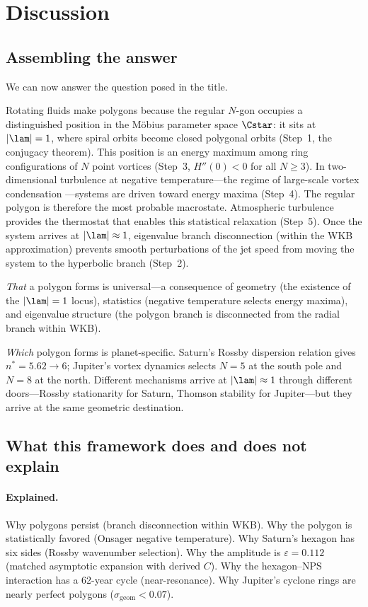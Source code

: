 \section{Discussion}
\label{sec:discussion}

\subsection{Assembling the answer}

We can now answer the question posed in the title.

Rotating fluids make polygons because the regular $N$-gon occupies a
distinguished position in the M\"obius parameter space $\Cstar$: it sits
at $|\lam| = 1$, where spiral orbits become closed polygonal orbits
(Step~1, the conjugacy theorem).  This position is an energy maximum
among ring configurations of $N$ point vortices (Step~3, $H''(0) < 0$
for all $N \ge 3$).  In two-dimensional turbulence at negative
temperature---the regime of large-scale vortex condensation
\citep{Onsager1949}---systems are driven toward energy maxima (Step~4).
The regular polygon is therefore the most probable macrostate.
Atmospheric turbulence provides the thermostat that enables this
statistical relaxation (Step~5).  Once the system arrives at
$|\lam| \approx 1$, eigenvalue branch disconnection (within the WKB
approximation) prevents smooth perturbations of the jet speed from
moving the system to the hyperbolic branch (Step~2).

\emph{That} a polygon forms is universal---a consequence of geometry
(the existence of the $|\lam| = 1$ locus), statistics (negative
temperature selects energy maxima), and eigenvalue structure (the polygon
branch is disconnected from the radial branch within WKB).

\emph{Which} polygon forms is planet-specific.  Saturn's Rossby
dispersion relation gives $n^* = 5.62 \to 6$; Jupiter's vortex dynamics
selects $N = 5$ at the south pole and $N = 8$ at the north.  Different
mechanisms arrive at $|\lam| \approx 1$ through different doors---Rossby
stationarity for Saturn, Thomson stability for Jupiter---but they arrive
at the same geometric destination.

\subsection{What this framework does and does not explain}

\paragraph{Explained.}
Why polygons persist (branch disconnection within WKB).  Why the polygon is
statistically favored (Onsager negative temperature).  Why Saturn's
hexagon has six sides (Rossby wavenumber selection).  Why the amplitude
is $\varepsilon = 0.112$ (matched asymptotic expansion with derived $C$).
Why the hexagon--NPS interaction has a 62-year cycle (near-resonance).
Why Jupiter's cyclone rings are nearly perfect polygons
($\sigma_{\mathrm{geom}} < 0.07$).

